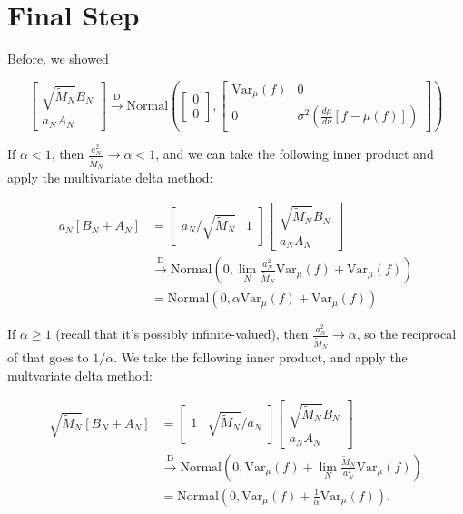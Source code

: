 \documentclass{article}
\begin{document}
\section{Final Step}

Before, we showed

$$
\begin{bmatrix}
\sqrt{\tilde{M}_N} B_N \\
a_N A_N
\end{bmatrix}
\overset{\text{D}}{\to}
\text{Normal}\left( 
\begin{bmatrix}
0 \\
0
\end{bmatrix},
\begin{bmatrix}
\text{Var}_{\mu}(f) & 0 \\
0 & \sigma^2\left( \frac{d\mu}{d\nu}\left[f - \mu(f) \right] \right)
\end{bmatrix}
\right)
$$

If $\alpha < 1$, then $\frac{a_N^2}{\tilde{M}_N} \to \alpha < 1$, and we can take the following inner product and apply the multivariate delta method:

\begin{align*}
a_N \left[ B_N + A_N    \right] 
&= 
\begin{bmatrix}
a_N / \sqrt{\tilde{M}_N} & 1  
\end{bmatrix}
\begin{bmatrix}
\sqrt{\tilde{M}_N} B_N \\
a_N A_N
\end{bmatrix} \\
& \overset{\text{D}}{\to}
\text{Normal}\left( 
0,
\lim_N \frac{a_N^2}{\tilde{M}_N}\text{Var}_{\mu}(f) + \text{Var}_{\mu}(f)
\right) \\
&= \text{Normal}\left( 
0,
\alpha \text{Var}_{\mu}(f) +  \text{Var}_{\mu}(f)
\right)
\end{align*}


If $\alpha \ge 1$ (recall that it's possibly infinite-valued), then $\frac{a_N^2}{\tilde{M}_N} \to \alpha$, so the reciprocal of that goes to $1/\alpha$. We take the following inner product, and apply the multvariate delta method:

\begin{align*}
\sqrt{\tilde{M}_N} \left[ B_N + A_N    \right] 
&= 
\begin{bmatrix}
1 & \sqrt{\tilde{M}_N}/a_N
\end{bmatrix}
\begin{bmatrix}
\sqrt{\tilde{M}_N} B_N \\
a_N A_N
\end{bmatrix} \\
& \overset{\text{D}}{\to}
\text{Normal}\left( 
0,
\text{Var}_{\mu}(f) + \lim_N \frac{\tilde{M}_N}{a_N^2}\text{Var}_{\mu}(f)
\right) \\
&= \text{Normal}\left( 
0,
\text{Var}_{\mu}(f) + \frac{1}{\alpha} \text{Var}_{\mu}(f)
\right).
\end{align*}
\end{document}
